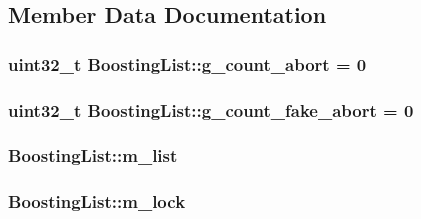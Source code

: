 \subsection{Member Data Documentation}
\hypertarget{classBoostingList_a1959338dbec4dff7dde70241c1b55178}{
\subsubsection[{g\-\_\-count\-\_\-abort}]{\setlength{\rightskip}{0pt plus 5cm}uint32\-\_\-t Boosting\-List\-::g\-\_\-count\-\_\-abort = 0\hspace{0.3cm}{\ttfamily [private]}}}\label{classBoostingList_a1959338dbec4dff7dde70241c1b55178}
\hypertarget{classBoostingList_ab25416a1dae12a3674ebbf6195182675}{
\subsubsection[{g\-\_\-count\-\_\-fake\-\_\-abort}]{\setlength{\rightskip}{0pt plus 5cm}uint32\-\_\-t Boosting\-List\-::g\-\_\-count\-\_\-fake\-\_\-abort = 0\hspace{0.3cm}{\ttfamily [private]}}}\label{classBoostingList_ab25416a1dae12a3674ebbf6195182675}
\hypertarget{classBoostingList_a2050d7b396704887ab33cdeabaa48dae}{
\subsubsection[{m\-\_\-list}]{ Boosting\-List\-::m\-\_\-list\hspace{0.3cm}{\ttfamily [private]}}}\label{classBoostingList_a2050d7b396704887ab33cdeabaa48dae}
\hypertarget{classBoostingList_a6f740d1ae0796e5189304db843a51f65}{
\subsubsection[{m\-\_\-lock}]{ Boosting\-List\-::m\-\_\-lock\hspace{0.3cm}{\ttfamily [private]}}}\label{classBoostingList_a6f740d1ae0796e5189304db843a51f65}
